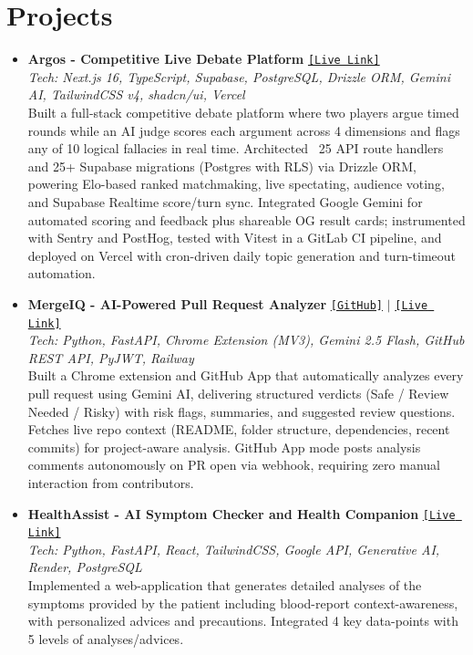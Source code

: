 \documentclass[11pt]{article}
\begin{document}
\section*{Projects}
\begin{itemize}

    \item \textbf{Argos - Competitive Live Debate Platform}
    \hfill \href{https://argos-indol.vercel.app}{\texttt{[Live Link]}} \\
    \textit{Tech: Next.js 16, TypeScript, Supabase, PostgreSQL, Drizzle ORM, Gemini AI, TailwindCSS v4, shadcn/ui, Vercel} \\
    Built a full-stack competitive debate platform where two players argue timed rounds while an AI judge scores each argument across 4 dimensions and flags any of 10 logical fallacies in real time. Architected ~25 API route handlers and 25+ Supabase migrations (Postgres with RLS) via Drizzle ORM, powering Elo-based ranked matchmaking, live spectating, audience voting, and Supabase Realtime score/turn sync. Integrated Google Gemini for automated scoring and feedback plus shareable OG result cards; instrumented with Sentry and PostHog, tested with Vitest in a GitLab CI pipeline, and deployed on Vercel with cron-driven daily topic generation and turn-timeout automation.

    \item \textbf{MergeIQ - AI-Powered Pull Request Analyzer}
    \hfill \href{https://github.com/primetree2/mergeiq}{\texttt{[GitHub]}} $\vert$ \href{https://web-production-6f4dd.up.railway.app}{\texttt{[Live Link]}} \\
    \textit{Tech: Python, FastAPI, Chrome Extension (MV3), Gemini 2.5 Flash, GitHub REST API, PyJWT, Railway} \\
    Built a Chrome extension and GitHub App that automatically analyzes every pull request using Gemini AI, delivering structured verdicts (Safe / Review Needed / Risky) with risk flags, summaries, and suggested review questions. Fetches live repo context (README, folder structure, dependencies, recent commits) for project-aware analysis. GitHub App mode posts analysis comments autonomously on PR open via webhook, requiring zero manual interaction from contributors.

    \item \textbf{HealthAssist - AI Symptom Checker and Health Companion} 
    \hfill \href{https://health-assist-rose.vercel.app/}{\texttt{[Live Link]}} \\
    \textit{Tech: Python, FastAPI, React, TailwindCSS, Google API, Generative AI, Render, PostgreSQL} \\
    Implemented a web-application that generates detailed analyses of the symptoms provided by the patient including blood-report context-awareness, with personalized advices and precautions. Integrated 4 key data-points with 5 levels of analyses/advices.


\end{itemize}
\end{document}
